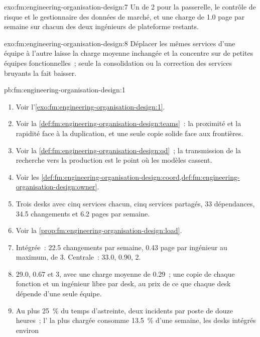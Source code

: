 \begin{solution}{exo:fm:engineering-organisation-design:7}
Un  de 2 pour la passerelle, le contrôle de risque et le gestionnaire des données de marché, et une charge de 1.0 page par semaine sur chacun des deux
ingénieurs de plateforme restants.
\end{solution}

\begin{solution}{exo:fm:engineering-organisation-design:8}
Déplacer les mêmes services d'une équipe à l'autre laisse la charge moyenne inchangée et la concentre sur de petites équipes fonctionnelles~; seule la consolidation ou
la correction des services bruyants la fait baisser.
\end{solution}

\begin{solution}{pb:fm:engineering-organisation-design:1}
\begin{enumerate}
\item Voir l'\cref{exo:fm:engineering-organisation-design:1}.
\item Voir la \cref{def:fm:engineering-organisation-design:teams}~: la proximité et la rapidité face à la duplication, et une seule copie solide face aux frontières.
\item Voir la \cref{def:fm:engineering-organisation-design:qd}~; la transmission de la recherche vers la production est le point où les modèles cassent.
\item Voir les \cref{def:fm:engineering-organisation-design:coord,def:fm:engineering-organisation-design:owner}.
\item Trois desks avec cinq services chacun, cinq services partagés, 33 dépendances, 34.5 changements et 6.2 pages par semaine.
\item Voir la \cref{prop:fm:engineering-organisation-design:load}.
\item Intégrée~: 22.5 changements par semaine, 0.43 page par ingénieur au maximum,  de 3. Centrale~: 33.0, 0.90, 2.
\item 29.0, 0.67 et 3, avec une charge moyenne de 0.29~; une copie de chaque fonction et un ingénieur libre par desk, au prix de ce que chaque desk dépende d'une
seule équipe.
\item Au plus 25~\% du temps d'astreinte, deux incidents par poste de douze heures~; l' la plus chargée consomme 13.5~\% d'une semaine, les desks intégrés environ

\end{enumerate}
\end{solution}
